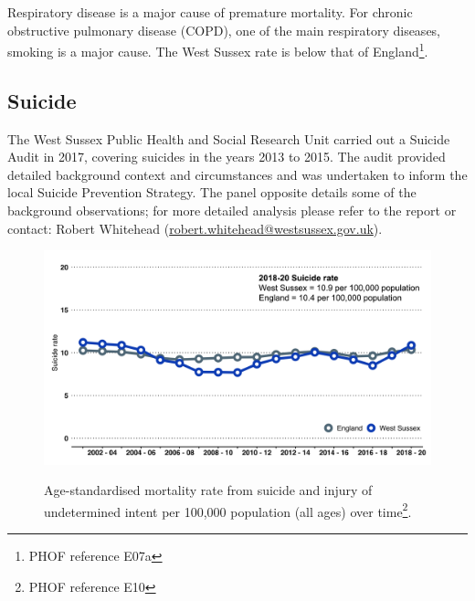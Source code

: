 Respiratory disease is a major cause of premature mortality. For chronic obstructive pulmonary disease (COPD), one of the main respiratory diseases, smoking is a major cause. The West Sussex rate is below that of England\footnote{PHOF reference E07a}. 

\clearpage

\subsection{Suicide}
The West Sussex Public Health and Social Research Unit carried out a Suicide Audit in 2017, covering suicides in the years 2013 to 2015. The audit provided detailed background context and circumstances and was undertaken to inform the local Suicide Prevention Strategy. The panel opposite details some of the background observations; for more detailed analysis please refer to the report or contact: Robert Whitehead (\url{robert.whitehead@westsussex.gov.uk}).

\begin{figure}[htp]
    \caption[Age-standardised mortality rate from suicide and injury of undetermined intent per 100,000 population (all ages) over time]{Age-standardised mortality rate from suicide and injury of undetermined intent per 100,000 population (all ages) over time\footnote{PHOF reference E10}.}
    \centering
    \includegraphics[width=\linewidth]{images/suicide_line.png}
    \label{fig:suicide}
\end{figure}

